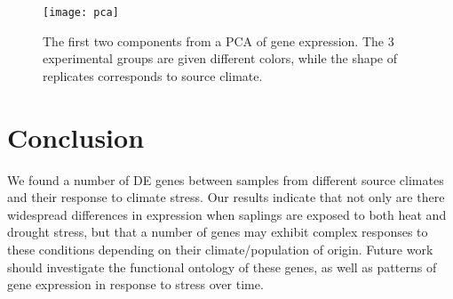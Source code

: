 \documentclass[11pt]{scrartcl}
\begin{document}
\begin{figure}
  \centering
  \texttt{[image: pca]}
  \caption{The first two components from a PCA of gene
    expression. The 3 experimental groups are given different colors,
    while the shape of replicates corresponds to source climate.}
  \label{fig:pca}
\end{figure}


\section{Conclusion}
\label{sec:conclusion}

We found a number of DE genes between samples from different source
climates and their response to climate stress. Our results indicate
that not only are there widespread differences in expression when
saplings are exposed to both heat and drought stress, but that a
number of genes may exhibit complex responses to these conditions
depending on their climate/population of origin. Future work should
investigate the functional ontology of these genes, as well as
patterns of gene expression in response to stress over time.

\newpage



\end{document}

